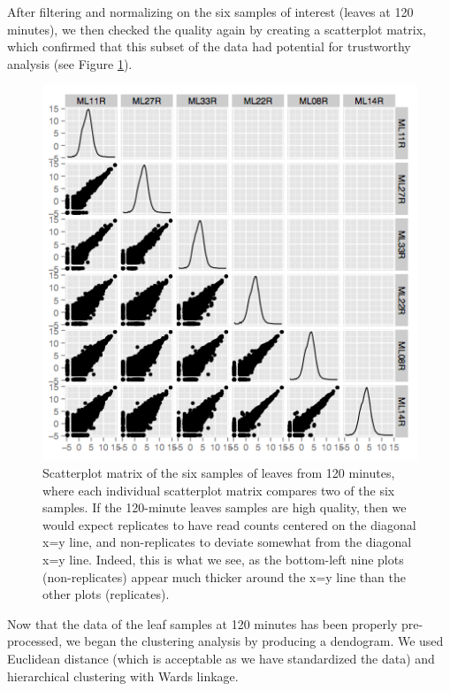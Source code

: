 \documentclass[11pt,a4paper,oldfontcommands,openany]{memoir}
\numberwithin{equation}{section} %
\begin{document}
After filtering and normalizing on the six samples of interest (leaves at 120 minutes), we then checked the quality again by creating a scatterplot matrix, which confirmed that this subset of the data had potential for trustworthy analysis (see Figure \ref{fig:L120scatter}).

\begin{figure}[H]
    \begin{framed}
    \centering
    \includegraphics[width=\textwidth]{L120scatter}
    \end{framed}
    \caption{Scatterplot matrix of the six samples of leaves from 120 minutes, where each individual scatterplot matrix compares two of the six samples. If the 120-minute leaves samples are high quality, then we would expect replicates to have read counts centered on the diagonal x=y line, and non-replicates to deviate somewhat from the diagonal x=y line. Indeed, this is what we see, as the bottom-left nine plots (non-replicates) appear much thicker around the x=y line than the other plots (replicates).}
    \label{fig:L120scatter}
\end{figure}

Now that the data of the leaf samples at 120 minutes has been properly pre-processed, we began the clustering analysis by producing a dendogram. We used Euclidean distance (which is acceptable as we have standardized the data) and hierarchical clustering with Wards linkage.
\end{document}
